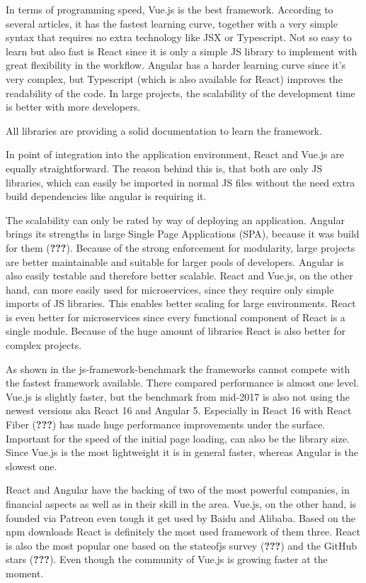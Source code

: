 \documentclass[american,a4paper,oneside,,tablecaptionabove]{scrbook}
\begin{document}
In terms of programming speed, Vue.js is the best framework. According
to several articles, it has the fastest learning curve, together with a
very simple syntax that requires no extra technology like JSX or
Typescript. Not so easy to learn but also fast is React since it is only
a simple JS library to implement with great flexibility in the workflow.
Angular has a harder learning curve since it's very complex, but
Typescript (which is also available for React) improves the readability
of the code. In large projects, the scalability of the development time
is better with more developers.

All libraries are providing a solid documentation to learn the
framework.

In point of integration into the application environment, React and
Vue.js are equally straightforward. The reason behind this is, that both
are only JS libraries, which can easily be imported in normal JS files
without the need extra build dependencies like angular is requiring it.

The scalability can only be rated by way of deploying an application.
Angular brings its strengths in large Single Page Applications (SPA),
because it was build for them ({\textbf{???}}). Because of the strong
enforcement for modularity, large projects are better maintainable and
suitable for larger pools of developers. Angular is also easily testable
and therefore better scalable. React and Vue.js, on the other hand, can
more easily used for microservices, since they require only simple
imports of JS libraries. This enables better scaling for large
environments. React is even better for microservices since every
functional component of React is a single module. Because of the huge
amount of libraries React is also better for complex projects.

As shown in the js-framework-benchmark the frameworks cannot compete
with the fastest framework available. There compared performance is
almost one level. Vue.js is slightly faster, but the benchmark from
mid-2017 is also not using the newest versions aka React 16 and Angular
5. Especially in React 16 with React Fiber ({\textbf{???}}) has made
huge performance improvements under the surface. Important for the speed
of the initial page loading, can also be the library size. Since Vue.js
is the most lightweight it is in general faster, whereas Angular is the
slowest one.

React and Angular have the backing of two of the most powerful
companies, in financial aspects as well as in their skill in the area.
Vue.js, on the other hand, is founded via Patreon even tough it get used
by Baidu and Alibaba. Based on the npm downloads React is definitely the
most used framework of them three. React is also the most popular one
based on the stateofjs survey ({\textbf{???}}) and the GitHub stars
({\textbf{???}}). Even though the community of Vue.js is growing faster
at the moment.
\end{document}
